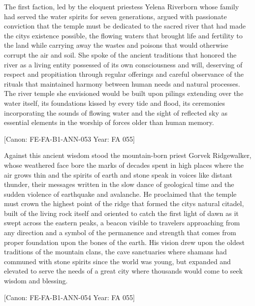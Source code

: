 The first faction, led by the eloquent priestess Yelena Riverborn whose
family had served the water spirits for seven generations, argued with
passionate conviction that the temple must be dedicated to the sacred
river that had made the city\textquotesingle s existence possible, the
flowing waters that brought life and fertility to the land while
carrying away the wastes and poisons that would otherwise corrupt the
air and soil. She spoke of the ancient traditions that honored the river
as a living entity possessed of its own consciousness and will,
deserving of respect and propitiation through regular offerings and
careful observance of the rituals that maintained harmony between human
needs and natural processes. The river temple she envisioned would be
built upon pilings extending over the water itself, its foundations
kissed by every tide and flood, its ceremonies incorporating the sounds
of flowing water and the sight of reflected sky as essential elements in
the worship of forces older than human memory.

{[}Canon: FE-FA-B1-ANN-053 \textbar{} Year: FA 055{]}

Against this ancient wisdom stood the mountain-born priest Gorvek
Ridgewalker, whose weathered face bore the marks of decades spent in
high places where the air grows thin and the spirits of earth and stone
speak in voices like distant thunder, their messages written in the slow
dance of geological time and the sudden violence of earthquake and
avalanche. He proclaimed that the temple must crown the highest point of
the ridge that formed the city\textquotesingle s natural citadel, built
of the living rock itself and oriented to catch the first light of dawn
as it swept across the eastern peaks, a beacon visible to travelers
approaching from any direction and a symbol of the permanence and
strength that comes from proper foundation upon the bones of the earth.
His vision drew upon the oldest traditions of the mountain clans, the
cave sanctuaries where shamans had communed with stone spirits since the
world was young, but expanded and elevated to serve the needs of a great
city where thousands would come to seek wisdom and blessing.

{[}Canon: FE-FA-B1-ANN-054 \textbar{} Year: FA 055{]}

